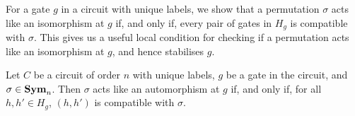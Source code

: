 \documentclass[../paper.tex]{subfiles}
\begin{document}

For a gate $g$ in a circuit with unique labels, we show that a permutation
$\sigma$ acts like an isomorphism at $g$ if, and only if, every pair of gates in
$H_g$ is compatible with $\sigma$. This gives us a useful local condition for
checking if a permutation acts like an isomorphism at $g$, and hence stabilises
$g$.

\begin{lem}
  Let $C$ be a circuit of order $n$ with unique labels, $g$ be a gate in the
  circuit, and $\sigma \in \text{\textbf{Sym}}_n$. Then $\sigma$ acts like an automorphism at
  $g$ if, and only if, for all $h, h' \in H_g$, $(h, h')$ is compatible with
  $\sigma$.
  \label{lem:isostab-compatible}
\end{lem}
\end{document}
